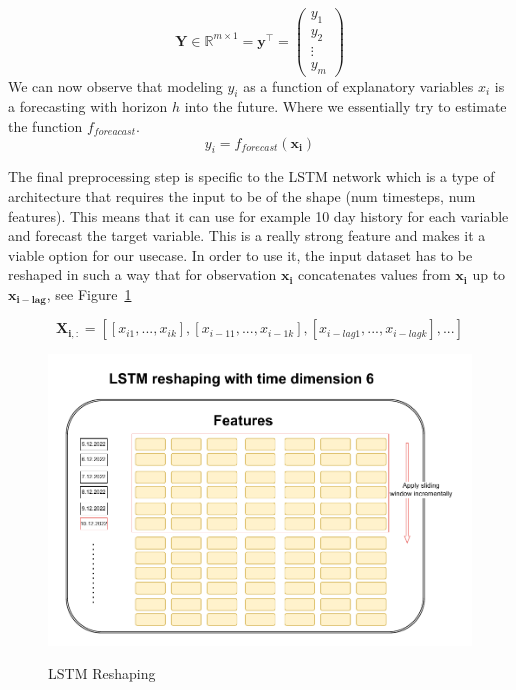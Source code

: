 \begin{equation}\label{eq:target}
    \mathbf{Y} \in \mathbb{R}^{m \times 1} = \mathbf{y^\top} = 
\begin{pmatrix}
    y_{1}\\
    y_{2}\\
    \vdots  \\
    y_{m} 
\end{pmatrix}
\end{equation}
We can now observe that modeling $y_i$ as a function of
explanatory variables $x_{i}$ is a forecasting with horizon $h$ into the future.
Where we essentially try to estimate the function $f_{foreacast}$.
\begin{equation}\label{eq:model_simple}
    y_i = f_{forecast}(\mathbf{x_{i}})
\end{equation}

The final preprocessing step is specific to the \ac{LSTM} network which is
a type of architecture that requires the input to be of 
the shape (num timesteps, num features).
This means that it can use for example 10 day history for each variable
and forecast the target variable. This is a really strong feature and 
makes it a viable option for our usecase. In order to use it, the input dataset
has to be reshaped in such a way that for observation $\mathbf{x_{i}}$ 
concatenates values from $\mathbf{x_{i}}$ 
up to $\mathbf{x_{i-lag}}$, see Figure~\ref{fig:dataset_lstm_reshape}


\begin{equation}\label{eq:lstm_reshape}
    \mathbf{X_{i,:}} = [[{x}_{i1},...,{x}_{ik}],
    [{x}_{i-11},...,{x}_{i-1k}],
    [{x}_{i-lag1},...,{x}_{i-lagk}],...]
\end{equation}

\begin{figure}[!h]
    \centering
    \caption{LSTM Reshaping}
        \includegraphics[width=1\textwidth]{Figures/LSTM_reshaping.drawio.pdf}
    \label{fig:dataset_lstm_reshape}
\end{figure}